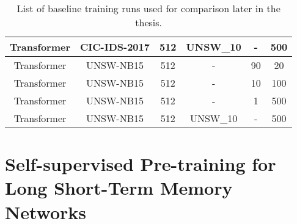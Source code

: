 \begin{table}[]
{\begin{tabular}{c|c|c|c|c|c}
		Transformer    & CIC-IDS-2017     & 512                                     & UNSW\_10	& -                    & 500                                           \\ \hline
		Transformer    & UNSW-NB15        & 512                                     & -			& 90                   & 20                                            \\ \hline
		Transformer    & UNSW-NB15        & 512                                     & -			& 10                   & 100                                           \\ \hline
		Transformer    & UNSW-NB15        & 512                                     & -			& 1                    & 500                                           \\ \hline
		Transformer    & UNSW-NB15        & 512                                     & UNSW\_10	& -                    & 500                                           \\
	\end{tabular}}
	\caption{List of baseline training runs used for comparison later in the thesis.}
	\label{table:experiments:baseline}
\end{table}

\section{Self-supervised Pre-training for Long Short-Term Memory Networks} \label{sec:experiments_lstm}

